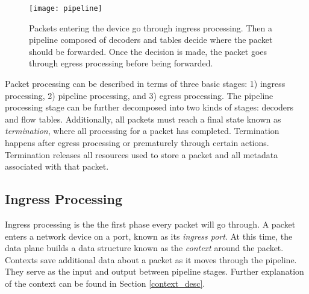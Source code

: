 

\begin{figure} [ht] 
\texttt{[image: pipeline]}
\caption{Packets entering the device go through ingress processing.
Then a pipeline composed of decoders and tables decide where the packet
should be forwarded. Once the decision is made, the packet goes through
egress processing before being forwarded.} 
\label{fg:pipeline_model} 
\end{figure}

Packet processing can be described in terms of three basic stages: 
1) ingress processing, 2) pipeline processing, and 3) egress processing. 
The pipeline processing stage can be further decomposed into two kinds
of stages: decoders and flow tables. Additionally, all packets must reach
a final state known as \textit{termination}, where all processing for a packet
has completed. Termination happens after egress processing or prematurely through certain actions. Termination releases all resources used to store a packet and all metadata associated with that packet. 



\subsection{Ingress Processing} \label{ingress_desc}

Ingress processing is the the first phase every packet will go through.
A packet enters a network device on a port, known as its \emph{ingress port}.
At this time, the data plane builds a data structure known as the
\emph{context} around the packet. 
Contexts save additional data about a packet as it moves through the pipeline.
They serve as the input and output between pipeline stages.
Further explanation of the context can be found in Section \ref{context_desc}.

